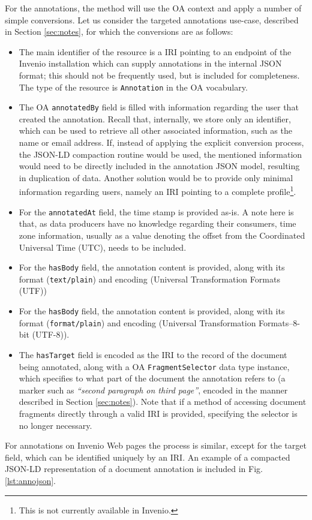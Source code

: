 For the annotations, the method will use the OA context and apply a number of
simple conversions. Let us consider the targeted annotations use-case,
described in Section \ref{sec:notes}, for which the conversions are as follows:
\begin{itemize}
  \item The main identifier of the resource is a IRI pointing to an endpoint of
        the Invenio installation which can supply annotations in the internal
        JSON format; this should not be frequently used, but is included for
        completeness. The type of the resource is \texttt{Annotation} in the
        OA vocabulary.
  \item The OA \texttt{annotatedBy} field is filled with information regarding
        the user that created the annotation. Recall that, internally, we store
        only an identifier, which can be used to retrieve all other associated
        information, such as the name or email address. If, instead of applying
        the explicit conversion process, the JSON-LD compaction routine would be
        used, the mentioned information would need to be directly included in
        the annotation JSON model, resulting in duplication of data. Another
        solution would be to provide only minimal information regarding users,
        namely an IRI pointing to a complete profile\footnote{This is not
        currently available in Invenio.}.
  \item For the \texttt{annotatedAt} field, the time stamp is provided as-is. A
        note here is that, as data producers have no knowledge regarding their
        consumers, time zone information, usually as a value denoting the offset
        from the Coordinated Universal Time (UTC), needs to be included.
  \item For the \texttt{hasBody} field, the annotation content is provided, along
        with its format (\texttt{text/plain}) and encoding (Universal
        Transformation Formats (UTF))
  \item For the \texttt{hasBody} field, the annotation content is provided, along
        with its format (\texttt{format/plain}) and encoding (Universal
        Transformation Formats--8-bit (UTF-8)).
  \item The \texttt{hasTarget} field is encoded as the IRI to the record of the
        document being annotated, along with a OA \texttt{FragmentSelector}
        data type instance, which specifies to what part of the document the
        annotation refers to (a marker such as \textit{``second paragraph on
        third page''}, encoded in the manner described in
        Section \ref{sec:notes}). Note that if a method of accessing document
        fragments directly through a valid IRI is provided, specifying the
        selector is no longer necessary.
\end{itemize}
For annotations on Invenio Web pages the process is similar, except for the
target field, which can be identified uniquely by an IRI. An example of a
compacted JSON-LD representation of a document annotation is included in Fig.
\ref{lst:annojson}.

